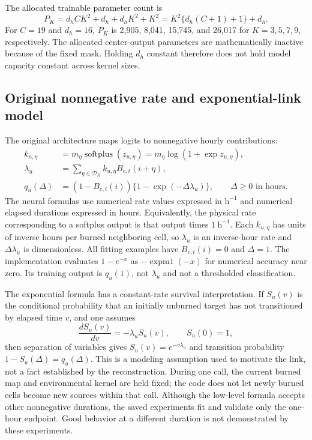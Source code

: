 \documentclass[11pt,a4paper]{article}
\begin{document}
The allocated trainable parameter count is
\begin{equation}
 P_K=d_hCK^2+d_h+d_hK^2+K^2=K^2\{d_h(C+1)+1\}+d_h.
\end{equation}
For $C=19$ and $d_h=16$, $P_K$ is 2,905, 8,041, 15,745, and 26,017 for
$K=3,5,7,9$, respectively. The allocated center-output parameters are
mathematically inactive because of the fixed mask. Holding $d_h$ constant
therefore does not hold model capacity constant across kernel sizes.

\subsection{Original nonnegative rate and exponential-link model}

The original architecture maps logits to nonnegative hourly contributions:
\begin{align}
 k_{u,\eta}&=m_\eta\operatorname{softplus}(z_{u,\eta})
            =m_\eta\log(1+\exp z_{u,\eta}),\\
 \lambda_u&=\sum_{\eta\in\mathcal D_K}k_{u,\eta}B_{e,t}(i+\eta),\\
 q_u(\Delta)&=(1-B_{e,t}(i))\{1-\exp(-\Delta\lambda_u)\},
 \qquad \Delta\geq0\text{ in hours}.
 \label{eq:prob-original}
\end{align}
The neural formulas use numerical rate values expressed in $\mathrm{h^{-1}}$
and numerical elapsed durations expressed in hours. Equivalently, the
physical rate corresponding to a softplus output is that output times
$1\ \mathrm{h^{-1}}$. Each $k_{u,\eta}$ has units of inverse hours per burned neighboring cell,
so $\lambda_u$ is an inverse-hour rate and $\Delta\lambda_u$ is dimensionless.
All fitting examples have $B_{e,t}(i)=0$ and $\Delta=1$. The implementation
evaluates $1-e^{-x}$ as $-\operatorname{expm1}(-x)$ for numerical accuracy near
zero. Its training output is $q_u(1)$, not $\lambda_u$ and not a thresholded
classification.

The exponential formula has a constant-rate survival interpretation. If
$S_u(v)$ is the conditional probability that an initially unburned target
has not transitioned by elapsed time $v$, and one assumes
\begin{equation}
 \frac{dS_u(v)}{dv}=-\lambda_uS_u(v),\qquad S_u(0)=1,
\end{equation}
then separation of variables gives $S_u(v)=e^{-v\lambda_u}$ and transition
probability $1-S_u(\Delta)=q_u(\Delta)$. This is a modeling assumption used
to motivate the link, not a fact established by the reconstruction. During
one call, the current burned map and environmental kernel are held fixed;
the code does not let newly burned cells become new sources within that call.
Although the low-level formula accepts other nonnegative durations, the saved
experiments fit and validate only the one-hour endpoint. Good behavior at a
different duration is not demonstrated by these experiments.
\end{document}

